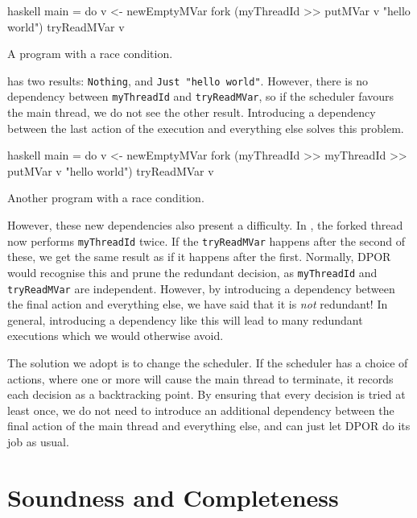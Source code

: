 \begin{listing}
\centering
\begin{cminted}{haskell}
main = do
  v <- newEmptyMVar
  fork (myThreadId >> putMVar v "hello world")
  tryReadMVar v
\end{cminted}
\caption{A program with a race condition.}\label{lst:daemon1}
\end{listing}

 has two results: \verb|Nothing|, and
\verb|Just "hello world"|.  However, there is no dependency between
\verb|myThreadId| and \verb|tryReadMVar|, so if the scheduler favours
the main thread, we do not see the other result.  Introducing a
dependency between the last action of the execution and everything
else solves this problem.

\begin{listing}
\centering
\begin{cminted}{haskell}
main = do
  v <- newEmptyMVar
  fork (myThreadId >> myThreadId >> putMVar v "hello world")
  tryReadMVar v
\end{cminted}
\caption{Another program with a race condition.}\label{lst:daemon2}
\end{listing}

However, these new dependencies also present a difficulty.  In
, the forked thread now performs \verb|myThreadId|
twice.  If the \verb|tryReadMVar| happens after the second of these,
we get the same result as if it happens after the first.  Normally,
DPOR would recognise this and prune the redundant decision, as
\verb|myThreadId| and \verb|tryReadMVar| are independent.  However, by
introducing a dependency between the final action and everything else,
we have said that it is \emph{not} redundant!  In general, introducing
a dependency like this will lead to many redundant executions which we
would otherwise avoid.

The solution we adopt is to change the scheduler.  If the scheduler
has a choice of actions, where one or more will cause the main thread
to terminate, it records each decision as a backtracking point.  By
ensuring that every decision is tried at least once, we do not need to
introduce an additional dependency between the final action of the
main thread and everything else, and can just let DPOR do its job as
usual.

\section{Soundness and Completeness}
\label{sec:dejafu-correctness}

